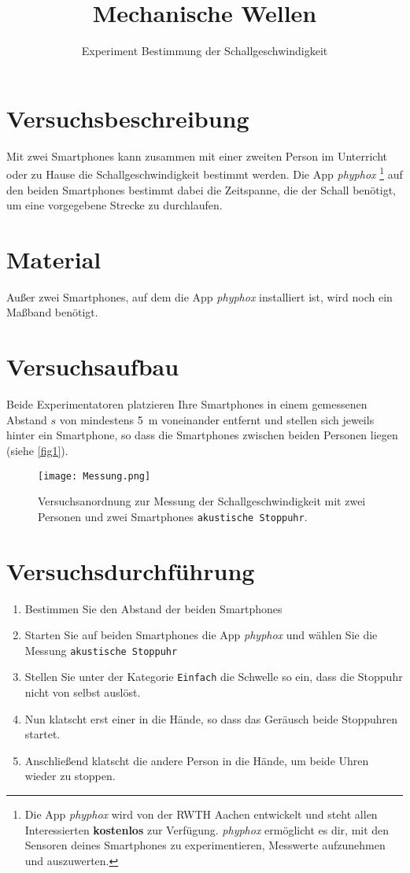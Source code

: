 \documentclass[12pt,oneside]{scrartcl}
\newcommand{\phyphox}{\textit{phyphox} }
\begin{document}
\title{Mechanische Wellen}
\subtitle{Experiment Bestimmung der Schallgeschwindigkeit}
\date{}
\maketitle
\thispagestyle{headings}
\section*{Versuchsbeschreibung}
Mit zwei Smartphones kann zusammen mit einer zweiten Person im Unterricht oder zu Hause die Schallgeschwindigkeit bestimmt werden. Die App \phyphox\footnote{Die App \phyphox wird von der RWTH Aachen entwickelt und steht allen Interessierten \textbf{kostenlos} zur Verfügung. \phyphox ermöglicht es dir, mit den Sensoren deines Smartphones zu experimentieren, Messwerte aufzunehmen und auszuwerten.}  auf den beiden Smartphones bestimmt dabei die Zeitspanne, die der Schall benötigt, um eine vorgegebene Strecke zu durchlaufen.
\section*{Material}
Außer zwei Smartphones, auf dem die App \phyphox installiert ist, wird noch ein Maßband benötigt.
\section*{Versuchsaufbau}
Beide Experimentatoren platzieren Ihre Smartphones in einem gemessenen Abstand $s$ von mindestens \SI{5}{\meter} voneinander entfernt und stellen sich jeweils hinter ein Smartphone, so dass die Smartphones zwischen beiden Personen liegen (siehe \autoref{fig1}).
\begin{figure}[ht]
	\centering
  \texttt{[image: Messung.png]}
	\caption{{\small Versuchsanordnung zur Messung der Schallgeschwindigkeit mit zwei Personen und zwei Smartphones \texttt{akustische Stoppuhr}.}}
	\label{fig1}
\end{figure}
\section*{Versuchsdurchführung}
\begin{enumerate}
\item Bestimmen Sie den Abstand der beiden Smartphones
\item Starten Sie auf beiden Smartphones die App \phyphox und wählen Sie die Messung \texttt{akustische Stoppuhr}
\item Stellen Sie unter der Kategorie \texttt{Einfach} die Schwelle so ein, dass die Stoppuhr nicht von selbst auslöst.
\item Nun klatscht erst einer in die Hände, so dass das Geräusch beide Stoppuhren startet.
\item Anschließend klatscht die andere Person in die Hände, um beide Uhren wieder zu stoppen.
\end{enumerate}
\end{document}
